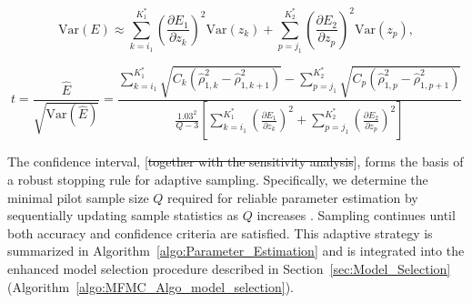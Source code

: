 \[
\text{Var}(E) \approx \sum_{k=i_1}^{K_1^*} \left(\frac{\partial E_1}{\partial z_k}\right)^2\text{Var}(z_k) + \sum_{p=j_1}^{K_2^*} \left(\frac{\partial E_2}{\partial z_p}\right)^2\text{Var}(z_p),
\]

\begin{equation}\label{eq:cost_decrease_t_test}
    t = \frac{\widehat E}{\sqrt{\text{Var}(\widehat E)}} = \frac{\sum_{k=i_1}^{K_1^*}\sqrt{C_k(\widehat \rho_{1,k}^2-\widehat\rho_{1,k+1}^2)} - \sum_{p=j_1}^{K_2^*}\sqrt{C_p(\widehat \rho_{1,p}^2-\widehat\rho_{1,p+1}^2)}}{\frac{1.03^2}{Q-3}\left[\sum_{k=i_1}^{K_1^*} \left(\frac{\partial E_1}{\partial z_k}\right)^2+\sum_{p=j_1}^{K_2^*} \left(\frac{\partial E_2}{\partial z_p}\right)^2\right]}
\end{equation}



The confidence interval, [\sout{together with the sensitivity analysis}], forms the basis of a robust stopping rule for adaptive sampling. Specifically, we determine the minimal pilot sample size $Q$ required for reliable parameter estimation by sequentially updating sample statistics as $Q$ increases \cite{La:2001,Wa:1947}. Sampling continues until both accuracy and confidence criteria are satisfied. This adaptive strategy is summarized in Algorithm~\ref{algo:Parameter_Estimation} and is integrated into the enhanced model selection procedure described in Section~\ref{sec:Model_Selection} (Algorithm~\ref{algo:MFMC_Algo_model_selection}).



